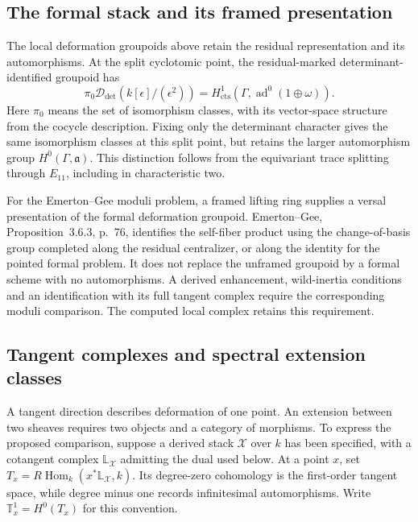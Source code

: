 \subsection{The formal stack and its framed presentation}
\label{v4-arith:w10-d:prop:EG-closed-point-s1}
The local deformation groupoids above retain the residual representation
and its automorphisms. At the split cyclotomic point, the
residual-marked determinant-identified groupoid has
\begin{equation}\label{v4-arith:w10-d:eq:EG-tangent-s1}
 \pi_0\mathcal D_{\mathrm{det}}(k[\epsilon]/(\epsilon^2))
       =H^1_{\mathrm{cts}}(\Gamma,\operatorname{ad}^0(1\oplus\omega)).
\end{equation}
Here $\pi_0$ means the set of isomorphism classes, with its vector-space
structure from the cocycle description. Fixing only the determinant
character gives the same isomorphism classes at this split point,
but retains the larger automorphism group $H^0(\Gamma,\mathfrak a)$.
This distinction follows from the equivariant trace splitting through
$E_{11}$, including in characteristic two.

For the Emerton--Gee moduli problem, a framed lifting ring supplies a
versal presentation of the formal deformation groupoid.
Emerton--Gee, Proposition~3.6.3, p.~76, identifies the self-fiber product
using the change-of-basis group completed along the residual
centralizer, or along the identity for the pointed formal problem.
It does not replace the unframed groupoid by a formal scheme with
no automorphisms. A derived enhancement, wild-inertia conditions and
an identification with its full tangent complex require the corresponding
moduli comparison. The computed local complex retains this requirement.

\subsection{Tangent complexes and spectral extension classes}
\label{v4-arith:w10-d:prop:spectral-ext1-s1}
A tangent direction describes deformation of one point. An extension
between two sheaves requires two objects and a category of morphisms.
To express the proposed comparison, suppose a derived stack
$\mathcal X$ over $k$ has been specified, with a cotangent complex
$\mathbb L_{\mathcal X}$ admitting the dual used below. At a point $x$,
set $T_x=R\operatorname{Hom}_k(x^*\mathbb L_{\mathcal X},k)$.
Its degree-zero cohomology is the first-order tangent space,
while degree minus one records infinitesimal automorphisms.
Write $\mathbb T^1_x=H^0(T_x)$ for this convention.

